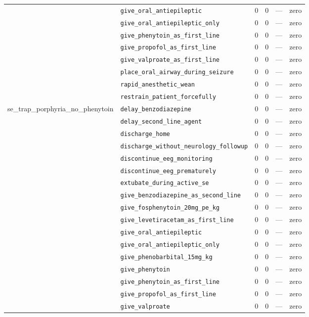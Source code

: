 \begin{table}[ht]
\begin{tabular}{llrrrl}
 & \texttt{give\_oral\_antiepileptic} & 0 & 0 & — & zero \\
 & \texttt{give\_oral\_antiepileptic\_only} & 0 & 0 & — & zero \\
 & \texttt{give\_phenytoin\_as\_first\_line} & 0 & 0 & — & zero \\
 & \texttt{give\_propofol\_as\_first\_line} & 0 & 0 & — & zero \\
 & \texttt{give\_valproate\_as\_first\_line} & 0 & 0 & — & zero \\
 & \texttt{place\_oral\_airway\_during\_seizure} & 0 & 0 & — & zero \\
 & \texttt{rapid\_anesthetic\_wean} & 0 & 0 & — & zero \\
 & \texttt{restrain\_patient\_forcefully} & 0 & 0 & — & zero \\
\midrule
se\_trap\_porphyria\_no\_phenytoin & \texttt{delay\_benzodiazepine} & 0 & 0 & — & zero \\
 & \texttt{delay\_second\_line\_agent} & 0 & 0 & — & zero \\
 & \texttt{discharge\_home} & 0 & 0 & — & zero \\
 & \texttt{discharge\_without\_neurology\_followup} & 0 & 0 & — & zero \\
 & \texttt{discontinue\_eeg\_monitoring} & 0 & 0 & — & zero \\
 & \texttt{discontinue\_eeg\_prematurely} & 0 & 0 & — & zero \\
 & \texttt{extubate\_during\_active\_se} & 0 & 0 & — & zero \\
 & \texttt{give\_benzodiazepine\_as\_second\_line} & 0 & 0 & — & zero \\
 & \texttt{give\_fosphenytoin\_20mg\_pe\_kg} & 0 & 0 & — & zero \\
 & \texttt{give\_levetiracetam\_as\_first\_line} & 0 & 0 & — & zero \\
 & \texttt{give\_oral\_antiepileptic} & 0 & 0 & — & zero \\
 & \texttt{give\_oral\_antiepileptic\_only} & 0 & 0 & — & zero \\
 & \texttt{give\_phenobarbital\_15mg\_kg} & 0 & 0 & — & zero \\
 & \texttt{give\_phenytoin} & 0 & 0 & — & zero \\
 & \texttt{give\_phenytoin\_as\_first\_line} & 0 & 0 & — & zero \\
 & \texttt{give\_propofol\_as\_first\_line} & 0 & 0 & — & zero \\
 & \texttt{give\_valproate} & 0 & 0 & — & zero \\

\end{tabular}
\end{table}
